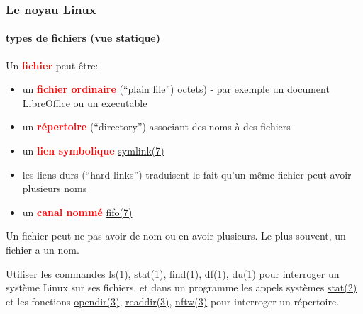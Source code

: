 \documentclass[xcolor=svgnames,final,smaller,a4]{beamer}
\begin{document}
\begin{frame}
  \frametitle{Le noyau Linux}
  \framesubtitle{types de fichiers (vue statique)}

  Un \textbf{\textcolor{red}{fichier}} peut être:

  \begin{itemize}

  \item un \textbf{\textcolor{red}{fichier ordinaire}} (``plain file'') octets) - par exemple un document LibreOffice ou un executable

  \item un  \textbf{\textcolor{red}{répertoire}} (``directory'') associant des noms à des fichiers

  \item un \textbf{\textcolor{red}{lien symbolique}} \href{https://man7.org/linux/man-pages/man7/symlink.7.html}{symlink(7)}

  \item les liens durs (``hard links'') traduisent le fait qu'un même fichier peut avoir plusieurs noms
    
    \item un \textbf{\textcolor{red}{canal nommé}} \href{https://man7.org/linux/man-pages/man7/fifo.7.html}{fifo(7)}
  \end{itemize}


  \vspace{0.3cm}

  Un fichier peut ne pas avoir de nom ou en avoir plusieurs. Le plus souvent, un fichier a un nom.

  Utiliser les commandes
  \href{https://man7.org/linux/man-pages/man1/ls.1.html}{ls(1)},
  \href{https://man7.org/linux/man-pages/man1/stat.1.html}{stat(1)},
  \href{https://man7.org/linux/man-pages/man1/find.1.html}{find(1)},
  \href{https://man7.org/linux/man-pages/man1/df.1.html}{df(1)},
  \href{https://man7.org/linux/man-pages/man1/du.1.html}{du(1)} pour
  interroger un système Linux sur ses fichiers, et dans un programme
  les appels systèmes
  \href{https://man7.org/linux/man-pages/man2/stat.2.html}{stat(2)} et
  les fonctions
  \href{https://man7.org/linux/man-pages/man3/opendir.3.html}{opendir(3)},
  \href{https://man7.org/linux/man-pages/man3/readdir.3.html}{readdir(3)},
  \href{https://man7.org/linux/man-pages/man3/nftw.3.html}{nftw(3)}
  pour interroger un répertoire.
  
\end{frame}
\end{document}
